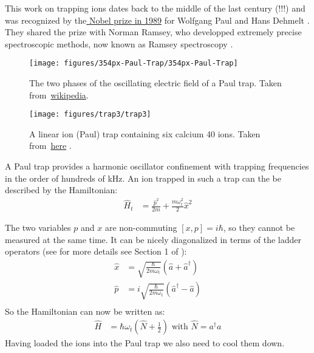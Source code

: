 \documentclass[10pt]{article}
\let\cite\citep
\providecommand\citep{\cite}
\begin{document}
This work on trapping ions dates back to the middle of the last century (!!!) and was recognized by the\href{https://www.nobelprize.org/prizes/physics/1989/summary/}{ Nobel prize in 1989} for Wolfgang Paul \cite{Paul_1990} and Hans Dehmelt \cite{Dehmelt_1990}. They shared the prize with Norman Ramsey, who developped extremely precise spectroscopic methods, now known as Ramsey spectroscopy \cite{Ramsey_1990}.
\begin{figure}[h!]
\begin{center}
\texttt{[image: figures/354px-Paul-Trap/354px-Paul-Trap]}
\caption{{The two phases of the oscillating electric field of a Paul trap. Taken
from~\href{https://en.wikipedia.org/wiki/Quadrupole_ion_trap}{wikipedia}.
{\label{692754}}%
}}
\end{center}
\end{figure}
\begin{figure}[h!]
\begin{center}
\texttt{[image: figures/trap3/trap3]}
\caption{{A linear ion (Paul) trap containing six calcium 40 ions. Taken
from~\href{https://quantumoptics.at/en/research/lintrap.html}{here} .
{\label{570611}}%
}}
\end{center}
\end{figure}

 A Paul trap provides a harmonic oscillator confinement with trapping frequencies in the order of hundreds of kHz. An ion trapped in such a trap can the be described by the Hamiltonian:
\begin{align}\label{Eq:HamHO}
\hat{H}_{t} &= \frac{\hat{p}^2}{2m}+ \frac{m\omega_t^2}{2}\hat{x}^2
\end{align}

The two variables $p$ and $x$ are non-commuting $[x, p] = i\hbar$, so they cannot be measured at the same time. It can be nicely diagonalized in terms of the ladder operators (see for more details see Section 1 of \cite{Jendrzejewski}):
\begin{align}
\hat{x} &= \sqrt{\frac{\hbar}{2m\omega_t}}\left(\hat{a}+\hat{a}^\dag\right)\\
\hat{p} &= i\sqrt{\frac{\hbar}{2m\omega_t}}\left(\hat{a}^\dag-\hat{a}\right)\\
\end{align}
So the Hamiltonian can now be written as:
\begin{align}
\hat{H} &= \hbar \omega_t \left(\hat{N} + \frac{1}{2}\right)\text{ with } \hat{N} = a^\dag a
\end{align}
Having loaded the ions into the Paul trap we also need to cool them down.
\end{document}
